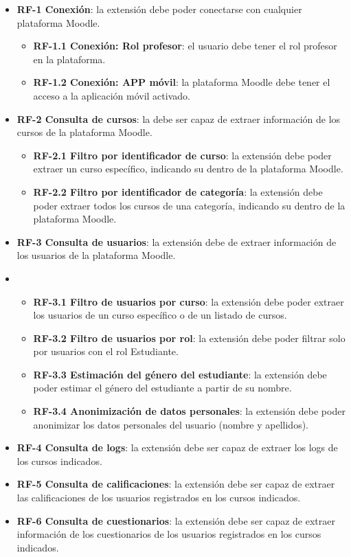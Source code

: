 \begin{itemize}
	\item \textbf{RF-1 Conexión}: la extensión debe poder conectarse con cualquier plataforma Moodle.
    \begin{itemize}
		\item \textbf{RF-1.1 Conexión: Rol profesor}: el usuario debe tener el rol profesor en la plataforma.
		\item \textbf{RF-1.2 Conexión: APP móvil}:  la plataforma Moodle debe tener el acceso a la aplicación móvil activado.
	\end{itemize}

	\item \textbf{RF-2 Consulta de cursos}: la debe ser capaz de extraer información de los cursos de la plataforma Moodle.
    \begin{itemize}
		\item \textbf{RF-2.1 Filtro por identificador de curso}: la extensión debe poder extraer un curso específico, indicando su  dentro de la plataforma Moodle.
		\item \textbf{RF-2.2 Filtro por identificador de categoría}: la extensión debe poder extraer todos los cursos de una categoría, indicando su  dentro de la plataforma Moodle.
	\end{itemize}

	\item \textbf{RF-3 Consulta de usuarios}: la extensión debe de extraer información de los usuarios de la plataforma Moodle.
	\item 	\begin{itemize}
		\item \textbf{RF-3.1 Filtro de usuarios por curso}: la extensión debe poder extraer los usuarios de un curso específico o de un listado de cursos. 
		\item \textbf{RF-3.2 Filtro de usuarios por rol}: la extensión debe poder filtrar solo por usuarios con el rol Estudiante. 
		\item \textbf{RF-3.3 Estimación del género del estudiante}: la extensión debe poder estimar el género del estudiante a partir de su nombre. 
		\item \textbf{RF-3.4 Anonimización de datos personales}: la extensión debe poder anonimizar los datos personales del usuario (nombre y apellidos). 
	\end{itemize}
	\item \textbf{RF-4 Consulta de logs}: la extensión debe ser capaz de extraer los logs de los cursos indicados. 
	\item \textbf{RF-5 Consulta de calificaciones}: la extensión debe ser capaz de extraer las calificaciones de los usuarios registrados en los cursos indicados. 
	\item \textbf{RF-6 Consulta de cuestionarios}: la extensión debe ser capaz de extraer información de los cuestionarios de los usuarios registrados en los cursos indicados. 
\end{itemize}

